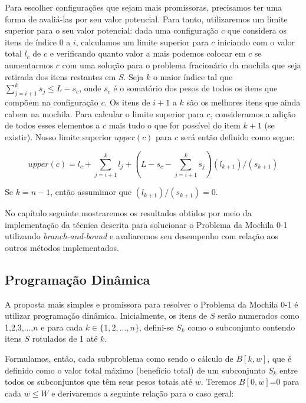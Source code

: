 Para escolher configurações que sejam mais promissoras, precisamos ter uma forma de avaliá-las por seu valor potencial. Para tanto, utilizaremos um limite superior para o seu valor potencial: dada uma configuração $c$ que considera os itens de índice $0$ a $i$, calculamos um limite superior para $c$ iniciando com o valor total $l_c$ de $c$ e verificando quanto valor a mais podemos colocar em $c$ se aumentarmos $c$ com uma solução para o problema fracionário da mochila que seja retirada dos itens restantes em $S$. Seja $k$ o maior índice tal que $\sum_{j=i+1}^{k} s_j \leq L-s_c$, onde $s_c$ é o somatório dos pesos de todos os itens que compõem na configuração $c$. Os itens de $i+1$ a $k$ são os melhores itens que ainda cabem na mochila. Para calcular o limite superior para $c$, consideramos a adição de todos esses elementos a $c$ mais tudo o que for possível do item $k+1$ (se existir). Nosso limite superior $upper(c)$ para $c$ será então definido como segue:


\begin{equation}
 upper(c)= l_c+ \sum_{j=i+1}^{k} l_j + (L-s_c-\sum_{j=i+1}^{k} s_j) (l_{k+1})/(s_{k+1})
\end{equation} 

Se $k=n-1$, então assumimor que $(l_{k+1})/(s_{k+1}) = 0$.

No capítulo seguinte mostraremos os resultados obtidos por meio da implementação da técnica descrita para solucionar o Problema da Mochila 0-1 utilizando {\it branch-and-bound} e avaliaremos seu desempenho com relação aos outros métodos implementados.



\subsection{Programação Dinâmica} \label{progdin}


A proposta mais simples e promissora para resolver o Problema da Mochila 0-1 é utilizar programação dinâmica. Inicialmente, os itens de $S$ serão numerados como 1,2,3,...,$n$ e para cada $k \in \{1,2,...,n\}$, defini-se $S_k$ como o subconjunto contendo itens $S$ rotulados de 1 até $k$.

Formulamos, então, cada subproblema como sendo o cálculo de $B[k,w]$, que é definido como o valor total máximo (benefício total) de um subconjunto
$S_k$ entre todos os subconjuntos que têm seus pesos totais até $w$. Teremos $B[0,w]$=0 para cada $w \leq W$ e derivaremos a seguinte
relação para o caso geral:


